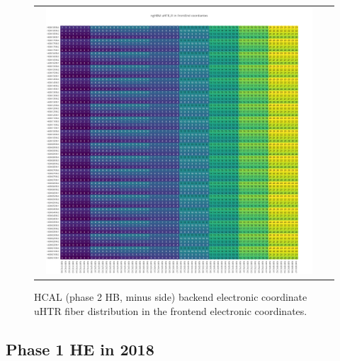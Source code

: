 \begin{figure}[htb]
 \begin{center}
  \begin{tabular}{cc}
   \includegraphics[angle=0,width=0.95\textwidth]{figures/appendix/ngHBM_uHTR_FI_in_FrontEnd.png}
  \end{tabular}
  \caption{HCAL (phase 2 HB, minus side) backend electronic coordinate uHTR fiber distribution in the frontend electronic coordinates.}
  \label{fig:lmapngHBMuHTRFIFEC}
 \end{center}
\end{figure}
\clearpage

\subsection{Phase 1 HE in 2018}
\clearpage

